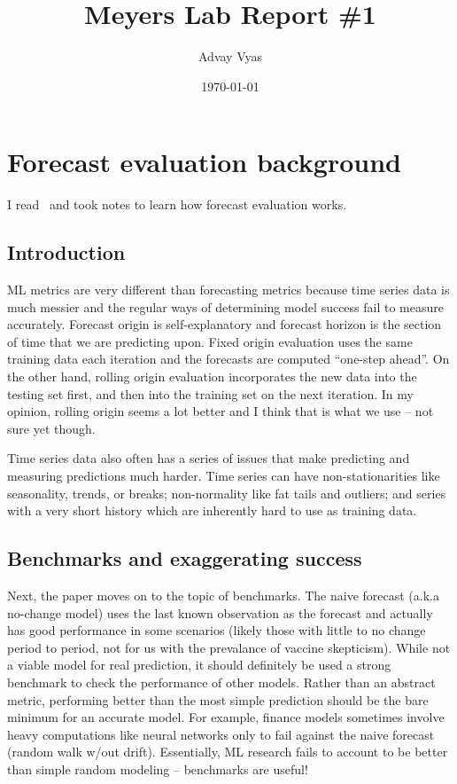 \documentclass[12pt]{article}
\title{Meyers Lab Report \#1}
\author{Advay Vyas}
\date{\today}
\begin{document}
\maketitle

\tableofcontents
\section{Forecast evaluation background}
I read~\cite{hewamalage23} and took notes to learn how forecast evaluation works.
\subsection{Introduction}
ML metrics are very different than forecasting metrics because time series data is much messier and the regular ways of determining model success fail to measure accurately. Forecast origin is self-explanatory and forecast horizon is the section of time that we are predicting upon. Fixed origin evaluation uses the same training data each iteration and the forecasts are computed ``one-step ahead''. On the other hand, rolling origin evaluation incorporates the new data into the testing set first, and then into the training set on the next iteration. In my opinion, rolling origin seems a lot better and I think that is what we use -- not sure yet though. 

Time series data also often has a series of issues that make predicting and measuring predictions much harder. Time series can have non-stationarities like seasonality, trends, or breaks; non-normality like fat tails and outliers; and series with a very short history which are inherently hard to use as training data. 

\subsection{Benchmarks and exaggerating success}
Next, the paper moves on to the topic of benchmarks. The naive forecast (a.k.a no-change model) uses the last known observation as the forecast and actually has good performance in some scenarios (likely those with little to no change period to period, not for us with the prevalance of vaccine skepticism). While not a viable model for real prediction, it should definitely be used a strong benchmark to check the performance of other models. Rather than an abstract metric, performing better than the most simple prediction should be the bare minimum for an accurate model. For example, finance models sometimes involve heavy computations like neural networks only to fail against the naive forecast (random walk w/out drift). Essentially, ML research fails to account to be better than simple random modeling -- benchmarks are useful!
\end{document}
